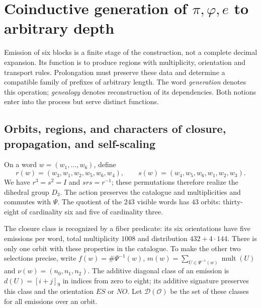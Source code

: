 \section{Coinductive generation of \texorpdfstring{\(\pi,\varphi,e\)}{pi, phi, e} to arbitrary depth}
\label{x_reciprocidad:sec:generacion}

Emission of six blocks is a finite stage of the construction, not a complete decimal expansion. Its function is to produce regions with multiplicity, orientation and transport rules. Prolongation must preserve these data and determine a compatible family of prefixes of arbitrary length. The word \emph{generation} denotes this operation; \emph{genealogy} denotes reconstruction of its dependencies. Both notions enter into the process but serve distinct functions.

\subsection{Orbits, regions, and characters of closure, propagation, and self-scaling}

On a word \(w=(w_1,\ldots,w_6)\), define
\[
 r(w)=(w_3,w_1,w_2,w_5,w_6,w_4),\qquad
 s(w)=(w_4,w_5,w_6,w_1,w_2,w_3).
\]
We have \(r^3=s^2=I\) and \(srs=r^{-1}\); these permutations therefore realize the dihedral group \(D_3\). The action preserves the catalogue and multiplicities and commutes with \(\Psi\). The quotient of the \(243\) visible words has \(43\) orbits: thirty-eight of cardinality six and five of cardinality three.

The closure class is recognized by a fiber predicate: its six orientations have five emissions per word, total multiplicity \(1008\) and distribution \(432+4\cdot144\). There is only one orbit with these properties in the catalogue. To make the other two selections precise, write \(f(w)=\#\Psi^{-1}(w)\), \(m(w)=\sum_{U\in\Psi^{-1}(w)}\operatorname{mult}(U)\) and \(\nu(w)=(n_0,n_1,n_2)\). The additive diagonal class of an emission is \(d(U)=[i+j]_9\) in indices from zero to eight; its additive signature preserves this class and the orientation \(ES\) or \(NO\). Let \(\mathcal D(\mathcal O)\) be the set of these classes for all emissions over an orbit.

